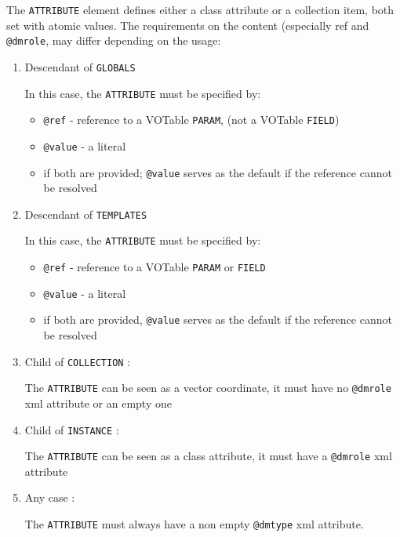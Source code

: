 
The \texttt{ATTRIBUTE} element defines either a class attribute or a collection item, both set with atomic values.
The requirements on
the content (especially ref and  \texttt{@dmrole}, may differ depending on
the usage:


\begin{enumerate}
\item Descendant of \texttt{GLOBALS}

In this case, the \texttt{ATTRIBUTE} must be specified by:
  \begin{itemize} 
      \item \texttt{@ref} - reference to a VOTable \texttt{PARAM}, 
      (not a VOTable \texttt{FIELD})
      \item \texttt{@value} - a literal
      \item  if both are provided; \texttt{@value} serves as the default 
      if the reference cannot be resolved
  \end{itemize}  

  
\item Descendant of \texttt{TEMPLATES} 

In this case, the \texttt{ATTRIBUTE} must be specified by:
  \begin{itemize} 
      \item \texttt{@ref} - reference to a VOTable \texttt{PARAM} 
      or \texttt{FIELD}
      \item \texttt{@value} - a literal
      \item if both are provided, \texttt{@value} serves as the default if 
      the reference cannot be resolved
  \end{itemize}  

\item Child of \texttt{COLLECTION} :

    The \texttt{ATTRIBUTE} can be seen as a vector coordinate, 
    it must have  no \texttt{@dmrole} xml attribute or an empty one
    
\item Child of \texttt{INSTANCE} :

    The \texttt{ATTRIBUTE} can be seen as a class attribute, 
    it must have a \texttt{@dmrole} xml attribute
           
\item Any case :

    The \texttt{ATTRIBUTE} must always have a non empty \texttt{@dmtype} xml attribute.
\end{enumerate}  
    
